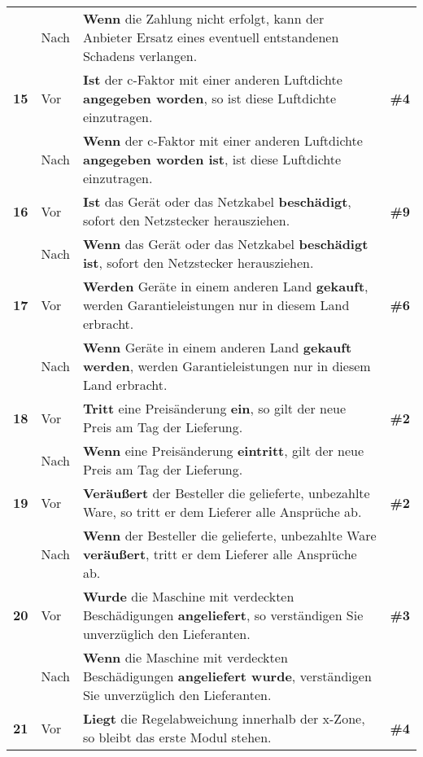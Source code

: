 \begin{longtable}{llp{}l}
& Nach & \textbf{Wenn} die Zahlung nicht erfolgt, kann der Anbieter Ersatz eines eventuell entstandenen Schadens verlangen. & \\
\tablevspace
{ \textbf{15}} & Vor & \textbf{Ist} der c-Faktor mit einer anderen Luftdichte \textbf{angegeben worden}, so ist diese Luftdichte einzutragen. & \textbf{\#4}\\
& Nach & \textbf{Wenn} der c-Faktor mit einer anderen Luftdichte \textbf{angegeben worden ist}, ist diese Luftdichte einzutragen. & \\
\tablevspace
{ \textbf{16}} & Vor & \textbf{Ist} das Gerät oder das Netzkabel \textbf{beschädigt}, sofort den Netzstecker herausziehen. & \textbf{\#9}\\
& Nach & \textbf{Wenn} das Gerät oder das Netzkabel \textbf{beschädigt ist}, sofort den Netzstecker herausziehen. & \\
\tablevspace
{ \textbf{17}} & Vor & \textbf{Werden} Geräte in einem anderen Land \textbf{gekauft}, werden Garantieleistungen nur in diesem Land erbracht. & \textbf{\#6}\\
& Nach & \textbf{Wenn} Geräte in einem anderen Land \textbf{gekauft werden}, werden Garantieleistungen nur in diesem Land erbracht. & \\
\tablevspace
{ \textbf{18}} & Vor & \textbf{Tritt} eine Preisänderung \textbf{ein}, so gilt der neue Preis am Tag der Lieferung. & \textbf{\#2}\\
& Nach & \textbf{Wenn} eine Preisänderung \textbf{eintritt}, gilt der neue Preis am Tag der Lieferung. & \\
\tablevspace
{ \textbf{19}} & Vor & \textbf{Veräußert} der Besteller die gelieferte, unbezahlte Ware, so tritt er dem Lieferer alle Ansprüche ab. & \textbf{\#2}\\
& Nach & \textbf{Wenn} der Besteller die gelieferte, unbezahlte Ware \textbf{veräußert}, tritt er dem Lieferer alle Ansprüche ab. & \\
\tablevspace
{ \textbf{20}} & Vor & \textbf{Wurde} die Maschine mit verdeckten Beschädigungen \textbf{angeliefert}, so verständigen Sie unverzüglich den Lieferanten. & \textbf{\#3}\\
& Nach & \textbf{Wenn} die Maschine mit verdeckten Beschädigungen \textbf{angeliefert wurde}, verständigen Sie unverzüglich den Lieferanten. & \\
\tablevspace
{ \textbf{21}} & Vor & \textbf{Liegt} die Regelabweichung innerhalb der x-Zone, so bleibt das erste Modul stehen. & \textbf{\#4}\\

\end{longtable}
